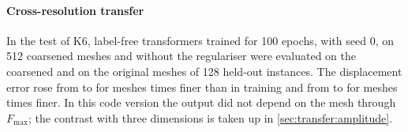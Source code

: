 \paragraph{Cross-resolution transfer}
In the test of K6, label-free transformers trained for 100 epochs, with seed 0, on 512
coarsened meshes and without the regulariser were evaluated on the coarsened and on the
original meshes of 128 held-out instances. The displacement error rose from
\numCoarsenLowCoarse{} to \numCoarsenLowFine{} for meshes \numCoarsenLow{} times finer
than in training and from \numCoarsenHighCoarse{} to \numCoarsenHighFine{} for meshes
\numCoarsenHigh{} times finer. In this code version the output did not depend on the mesh
through $F_{\max}$; the contrast with three dimensions is taken up in
\cref{sec:transfer:amplitude}.
